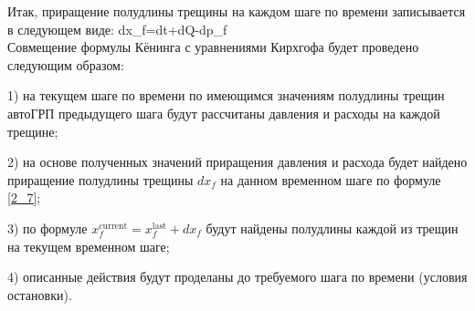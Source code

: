 Итак, приращение полудлины трещины на каждом шаге по времени записывается в следующем виде:
\beq\label{2_7}
dx_{\!f}=dt+dQ-dp_{\!f}
\eeq\\
Совмещение формулы Кёнинга с уравнениями Кирхгофа будет проведено следующим образом:

1) на текущем шаге по времени по имеющимся значениям полудлины трещин автоГРП предыдущего шага будут рассчитаны давления и расходы на каждой трещине;

2) на основе полученных значений приращения давления и расхода будет найдено приращение полудлины трещины $dx_{\!f}$ на данном временном шаге по формуле \eqref{2_7};

3) по формуле $x_{\!f}^{\text{current}}=x_{\!f}^{\text{last}}+dx_{\!f}$ будут найдены полудлины каждой из трещин на текущем временном шаге;

4) описанные действия будут проделаны до требуемого шага по времени (условия остановки).

